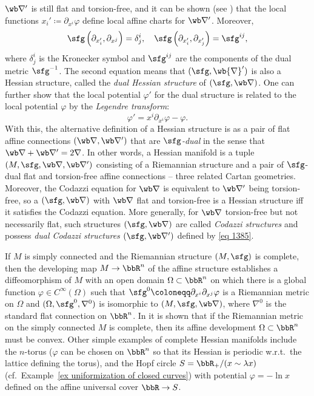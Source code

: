 \begin{example}
    $\wb\nabla'$ is still flat and torsion-free, and it can be shown (see \cite{Shima}) that the local functions $x_i'\coloneqq \partial_{x^i}\varphi$ define local affine charts for $\wb\nabla'$. Moreover, 
    \[\sfg\left(\partial_{x_i'},\partial_{x^j}\right)=\delta^i_j,\quad \sfg\left(\partial_{x_i'},\partial_{x_j'}\right)=\sfg^{ij},\]
    where $\delta^i_j$ is the Kronecker symbol and $\sfg^{ij}$ are the components of the dual metric $\sfg^{-1}$. The second equation means that $(\sfg,\wb{\nabla}')$ is also a Hessian structure, called the \emph{dual Hessian structure} of $(\sfg,\wb\nabla)$. One can further show that the local potential $\varphi'$ for the dual structure is related to the local potential $\varphi$ by the \emph{Legendre transform}:
    \[\varphi'=x^i\partial_{x^i}\varphi-\varphi.\]
    With this, the alternative definition of a Hessian structure is as a pair of flat affine connections $(\wb\nabla,\wb\nabla')$ that are \emph{$\sfg$-dual} in the sense that $\wb\nabla+\wb\nabla'=2\nabla$. In other words, a Hessian manifold is a tuple $(M,\sfg,\wb\nabla,\wb\nabla')$ consisting of a Riemannian structure and a pair of $\sfg$-dual flat and torsion-free affine connections -- three related Cartan geometries. Moreover, the Codazzi equation for $\wb\nabla$ is equivalent to $\wb\nabla'$ being torsion-free, so a $(\sfg,\wb\nabla)$ with $\wb\nabla$ flat and torsion-free is a Hessian structure iff it satisfies the Codazzi equation. More generally, for $\wb\nabla$ torsion-free but not necessarily flat, such structures $(\sfg,\wb\nabla)$ are called \emph{Codazzi structures} and possess \emph{dual Codazzi structures} $(\sfg,\wb\nabla')$ defined by \eqref{eq 1385}.

    If $M$ is simply connected and the Riemannian structure $(M,\sfg)$ is complete, then the developing map $M\to \bbR^n$ of the affine structure establishes a diffeomorphism of $M$ with an open domain $\Omega\subset \bbR^n$ on which there is a global function $\varphi\in C^\infty(\Omega)$ such that $\sfg^0\coloneqq \partial_{x^i}\partial_{x^j}\varphi$ is a Riemannian metric on $\Omega$ and $(\Omega,\sfg^0,\nabla^0)$ is isomorphic to $(M,\sfg,\wb\nabla)$, where $\nabla^0$ is the standard flat connection on $\bbR^n$. In \cite{Shima95} it is shown that if the Riemannian metric on the simply connected $M$ is complete, then its affine development $\Omega\subset\bbR^n$ must be convex. Other simple examples of complete Hessian manifolds include the $n$-torus ($\varphi$ can be chosen on $\bbR^n$ so that its Hessian is periodic w.r.t.\ the lattice defining the torus), and the Hopf circle $S=\bbR_+\slash (x\sim \lambda x)$ (cf.\ Example~\ref{ex uniformization of closed curves}) with potential $\varphi=-\ln x$ defined on the affine universal cover $\bbR\to S$.


\end{example}
